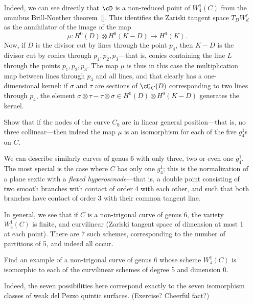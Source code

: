 Indeed, we can see directly that $\cD$ is a non-reduced point of $W^1_4(C)$ from the omnibus Brill-Noether theorem~\ref{}. This identifies the Zariski tangent space $T_DW^r_d$ as the annihilator of the image of the map
$$
\mu : H^0(D) \otimes H^0(K-D) \to H^0(K).
$$
Now, if $D$ is the divisor cut by lines through the point $p_4$, then $K-D$ is the divisor cut by conics through $p_1,p_2,p_3$---that is, conics containing the line $L$ through the points $p_1,p_2,p_3$. The map $\mu$ is thus in this case the multiplication map between lines through $p_4$ and all lines, and that clearly has a one-dimensional kernel: if $\sigma$ and $\tau$ are sections of $\cO_C(D)$ corresponding to two lines through $p_4$, the element $\sigma \otimes \tau - \tau \otimes \sigma \in H^0(D) \otimes H^0(K-D)$ generates the kernel.

\begin{exercise}
Show that if the nodes of the curve $C_0$ are in linear general position---that is, no three collinear---then indeed the map $\mu$ is an isomorphism for each of the five $g^1_4$s on $C$.
\end{exercise}

We can describe similarly curves of genus 6 with only three, two or even one $g^1_4$. The most special is the case where $C$ has only one $g^1_4$; this is the normalization of a plane sextic with a \emph{flexed hyperoscnode}---that is, a double point consisting of two smooth branches with contact of order 4 with each other, and such that both branches have contact of order 3 with their common tangent line.

In general, we see that if $C$ is a non-trigonal curve of genus 6, the variety $W^1_4(C)$ is finite, and curvilinear (Zariski tangent space of dimension at most 1 at each point). There are 7 such schemes, corresponding to the number of partitions of 5, and indeed all occur.

\begin{exercise}
Find an example of a non-trigonal curve of genus 6 whose scheme $W^1_4(C)$ is isomorphic to each of the curvilinear schemes of degree 5 and dimension 0.
\end{exercise}

Indeed, the seven possibilities here correspond exactly to the seven isomorphism classes of weak del Pezzo quintic surfaces. (Exercise? Cheerful fact?)



